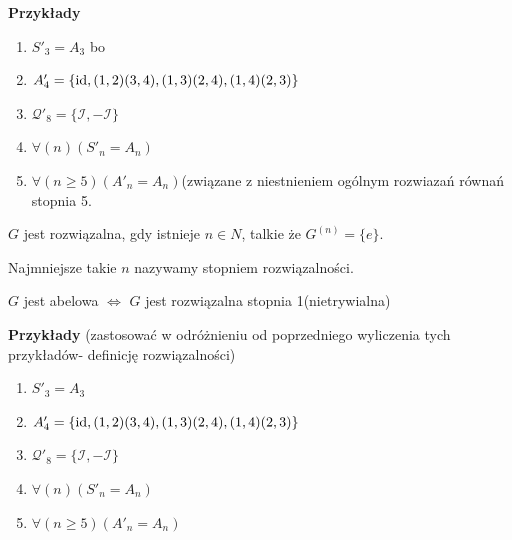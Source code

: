 \textbf{Przykłady} 
\begin{enumerate}[label=\arabic*)]
	\item $S'_{3} = A_3$ bo 
	\item $A'_{4} = \{\operatorname{id}, (1,2)(3,4), (1,3)(2,4), (1,4)(2,3)\} $ 
	\item $\mathcal{Q}'_{8} = \{\mathcal{I}, -\mathcal{I}\} $
	 \item $\forall\left( n \right)\left( S'_{n} = A_{n} \right)  $
	 \item $\forall\left( n \ge 5 \right) \left( A'_{n} = A_{n} \right) $(związane z niestnieniem ogólnym rozwiazań równań stopnia 5.
\end{enumerate}
\begin{definition}[Rozwiązalność.]
	$G$ jest rozwiązalna, gdy istnieje $n\in N$, talkie że $G^{(n)} = \{e\} $.

	Najmniejsze takie $n$ nazywamy stopniem rozwiązalności.
\end{definition} 
\begin{remark}
	$G$ jest abelowa $\iff $ $G$ jest rozwiązalna stopnia 1(nietrywialna)
\end{remark} 
\textbf{Przykłady}
(zastosować w odróżnieniu od poprzedniego wyliczenia tych przykładów- definicję rozwiązalności)
\begin{enumerate}[label=\arabic*)]
	\item $S'_{3} = A_3$  
	\item $A'_{4} = \{\operatorname{id}, (1,2)(3,4), (1,3)(2,4), (1,4)(2,3)\} $ 
	\item $\mathcal{Q}'_{8} = \{\mathcal{I}, -\mathcal{I}\} $
	 \item $\forall\left( n \right)\left( S'_{n} = A_{n} \right)  $
	 \item $\forall\left( n \ge 5 \right) \left( A'_{n} = A_{n} \right)$
\end{enumerate}

